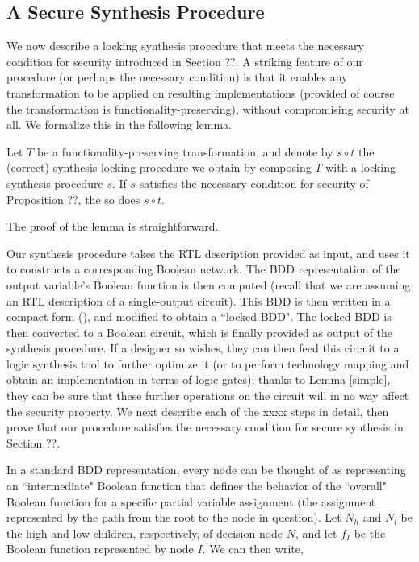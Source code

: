 \subsection{A Secure Synthesis Procedure}

We now describe a locking synthesis procedure that meets the necessary condition for security introduced in Section ??. A striking feature of our procedure (or perhaps the necessary condition) is that it enables any transformation to be applied on resulting implementations (provided of course the transformation is functionality-preserving), without compromising security at all. We formalize this in the following lemma.

\begin{lemma}\label{simple}
Let $T$ be a functionality-preserving transformation, and denote by $s \circ t$ the (correct) synthesis locking procedure we obtain by composing $T$ with a locking synthesis procedure $s$. If $s$ satisfies the necessary condition for security of Proposition ??, the so does $s \circ t$. 
\end{lemma}
The proof of the lemma is straightforward.

Our synthesis procedure takes the RTL description provided as input, and uses it to constructs a corresponding Boolean network. The BDD representation of the output variable's Boolean function is then computed (recall that we are assuming an RTL description of a single-output circuit). This BDD is then written in a compact form (), and modified to obtain a ``locked BDD". The locked BDD is then converted to a Boolean circuit, which is finally provided as output of the synthesis procedure. If a designer so wishes, they can then feed this circuit to a logic synthesis tool to further optimize it (or to perform technology mapping and obtain an implementation in terms of logic gates); thanks to Lemma \ref{simple}, they can be sure that these further operations on the circuit will in no way affect the security property.  We next describe each of the xxxx steps in detail, then prove that our procedure satisfies the necessary condition for secure synthesis in Section ??.

In a standard BDD representation, every node can be thought of as representing an ``intermediate" Boolean function that defines the behavior of the ``overall" Boolean function for a specific partial variable assignment (the assignment represented by the path from the root to the node in question). Let $N_h$ and $N_l$ be the high and low children, respectively, of decision node $N$, and let $f_{I}$ be the Boolean function represented by node $I$.  We can then write,

